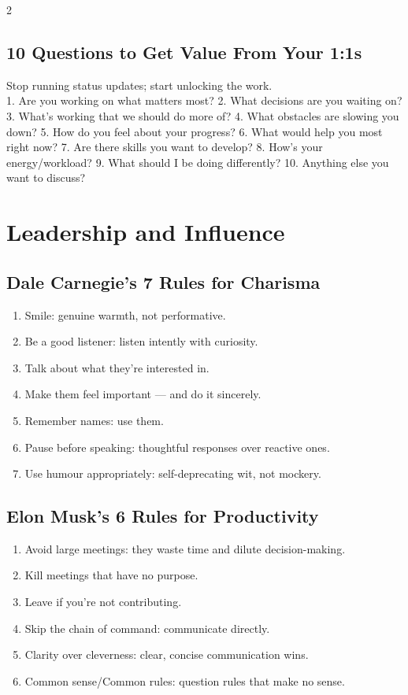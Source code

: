 \documentclass[10pt,a4paper]{article}
\begin{document}
\begin{multicols}{2}
\subsection{10 Questions to Get Value From Your 1:1s}
Stop running status updates; start unlocking the work.\\
1. Are you working on what matters most? 2. What decisions are you waiting on? 3. What's working that we should do more of? 4. What obstacles are slowing you down? 5. How do you feel about your progress? 6. What would help you most right now? 7. Are there skills you want to develop? 8. How's your energy/workload? 9. What should I be doing differently? 10. Anything else you want to discuss?

\section{Leadership and Influence}

\subsection{Dale Carnegie's 7 Rules for Charisma}
\begin{enumerate}
\item Smile: genuine warmth, not performative.
\item Be a good listener: listen intently with curiosity.
\item Talk about what they're interested in.
\item Make them feel important --- and do it sincerely.
\item Remember names: use them.
\item Pause before speaking: thoughtful responses over reactive ones.
\item Use humour appropriately: self-deprecating wit, not mockery.
\end{enumerate}

\subsection{Elon Musk's 6 Rules for Productivity}
\begin{enumerate}
\item Avoid large meetings: they waste time and dilute decision-making.
\item Kill meetings that have no purpose.
\item Leave if you're not contributing.
\item Skip the chain of command: communicate directly.
\item Clarity over cleverness: clear, concise communication wins.
\item Common sense/Common rules: question rules that make no sense.
\end{enumerate}


\end{multicols}
\end{document}
